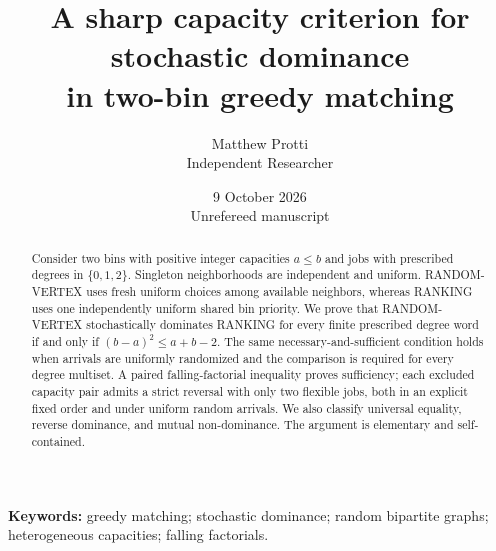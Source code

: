 \documentclass[11pt]{article}
\title{A sharp capacity criterion for stochastic dominance\\in two-bin greedy matching}
\author{Matthew Protti\\\small Independent Researcher}
\date{9 October 2026\\\small Unrefereed manuscript}
\begin{document}
\maketitle
\begin{abstract}
Consider two bins with positive integer capacities $a\le b$ and jobs with prescribed degrees in $\{0,1,2\}$. Singleton neighborhoods are independent and uniform. RANDOM-VERTEX uses fresh uniform choices among available neighbors, whereas RANKING uses one independently uniform shared bin priority. We prove that RANDOM-VERTEX stochastically dominates RANKING for every finite prescribed degree word if and only if $(b-a)^2\le a+b-2$. The same necessary-and-sufficient condition holds when arrivals are uniformly randomized and the comparison is required for every degree multiset. A paired falling-factorial inequality proves sufficiency; each excluded capacity pair admits a strict reversal with only two flexible jobs, both in an explicit fixed order and under uniform random arrivals. We also classify universal equality, reverse dominance, and mutual non-dominance. The argument is elementary and self-contained.
\end{abstract}
\noindent\textbf{Keywords:} greedy matching; stochastic dominance; random bipartite graphs; heterogeneous capacities; falling factorials.

\end{document}
